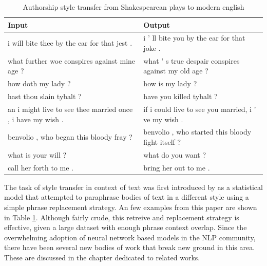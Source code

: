 \begin{table}[ht]
	\centering
	\begin{tabular}{ | p{.45\linewidth} | p{.45\linewidth} | }
		\hline
		\textbf{Input}                                              & \textbf{Output}                                      \\
		\hline \hline
		i will bite thee by the ear for that jest .                 & i ’ ll bite you by the ear for that joke .           \\
		\hline
		what further woe conspires against mine age ?               & what ’ s true despair conspires against my old age ? \\
		\hline
		how doth my lady ?                                          & how is my lady ?                                     \\
		\hline
		hast thou slain tybalt ?                                    & have you killed tybalt ?                             \\
		\hline
		an i might live to see thee married once , i have my wish . & if i could live to see you married, i ’ ve my wish . \\
		\hline
		benvolio , who began this bloody fray ?                     & benvolio , who started this bloody fight itself ?    \\
		\hline
		what is your will ?                                         & what do you want ?                                   \\
		\hline
		call her forth to me .                                      & bring her out to me .                                \\
		\hline
	\end{tabular}
	\caption{Authorship style transfer from Shakespearean plays to modern english}
	\label{tab:paraphrasing-for-style-results}
\end{table}

The task of style transfer in context of text was first introduced by \cite{xu2012paraphrasing} as a statistical model that attempted to paraphrase bodies of text in a different style using a simple phrase replacement strategy. An few examples from this paper are shown in Table \ref{tab:paraphrasing-for-style-results}. Although fairly crude, this retreive and replacement strategy is effective, given a large dataset with enough phrase context overlap. Since the overwhelming adoption of neural network based models in the NLP community, there have been several new bodies of work that break new ground in this area. These are discussed in the chapter dedicated to related works.


